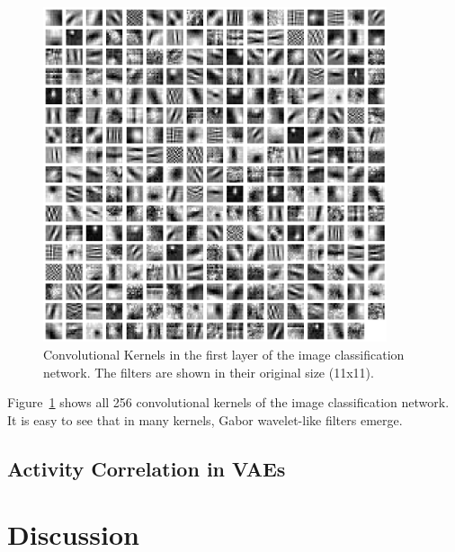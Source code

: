 \documentclass[11pt]{article}
\begin{document}
    \begin{figure}
        \centering
        \includegraphics[width=0.9\textwidth]{images/alexnet_classification_l1_kernels.png}
        \caption[Image classification - Layer 1 Kernels]{Convolutional Kernels in the first layer of the image classification network. The filters are shown in their original size (11x11).}
        \label{fig:classification_layer1_kernels}
    \end{figure}

    Figure~\ref{fig:classification_layer1_kernels} shows all 256 convolutional kernels of the image classification network.
    It is easy to see that in many kernels, Gabor wavelet-like filters emerge.

    \subsection{Activity Correlation in \acp{VAE}}\label{subsec:results_activity-correlation-in-vaes}


    \section{Discussion}\label{sec:discussion}
\end{document}
